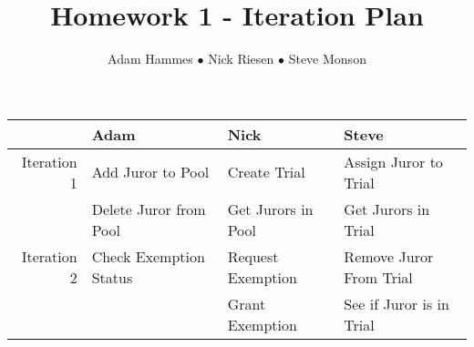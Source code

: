 \documentclass[10pt]{article}
\title{\vspace{.5in}Homework 1 - Iteration Plan}
\author{Adam Hammes $\bullet$ Nick Riesen $\bullet$ Steve Monson}
\begin{document}
\maketitle

\begin{center}
\begin{tabular}{| r | l | l | l |}
    \hline             & Adam & Nick & Steve \\
    \hline Iteration 1 & Add Juror to Pool & Create Trial & Assign Juror to Trial \\
    & Delete Juror from Pool & Get Jurors in Pool & Get Jurors in Trial \\
    \hline Iteration 2 & Check Exemption Status & Request Exemption & Remove Juror From Trial \\
    &                        & Grant Exemption & See if Juror is in Trial \\
    \hline
\end{tabular}
\end{center}
\end{document}

